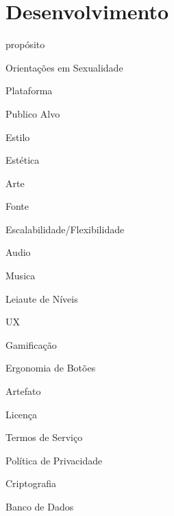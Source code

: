 \chapter{Desenvolvimento}\label{ch:Desenvolvimento}



propósito

Orientações em Sexualidade

Plataforma

Publico Alvo

Estilo

Estética

Arte

Fonte

Escalabilidade/Flexibilidade

Audio

Musica

Leiaute de Níveis

UX

Gamificação

Ergonomia de Botões

Artefato

Licença

Termos de Serviço

Política de Privacidade

Criptografia

Banco de Dados

